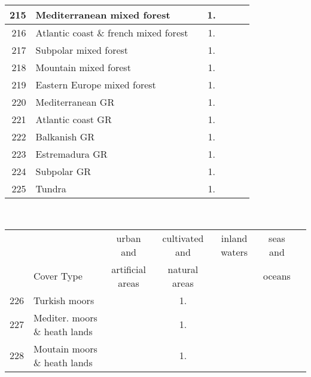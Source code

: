 {{\begin{tabular}{||r|l||c|c|c|c|c||}
 \hline
 \hline
         215  & Mediterranean mixed forest                                   &       &  1.   &       &       \\
 \hline
         216  & Atlantic coast \& french mixed forest                        &       &  1.   &       &       \\
 \hline
         217  & Subpolar mixed forest                                        &       &  1.   &       &       \\
 \hline
         218  & Mountain mixed forest                                        &       &  1.   &       &       \\
 \hline
         219  & Eastern Europe mixed forest                                  &       &  1.   &       &       \\
 \hline
 \hline
         220  & Mediterranean GR                                             &       &  1.   &       &       \\
 \hline
         221  & Atlantic coast GR                                            &       &  1.   &       &       \\
 \hline
         222  & Balkanish GR                                                 &       &  1.   &       &       \\
 \hline
         223  & Estremadura GR                                               &       &  1.   &       &       \\
 \hline
         224  & Subpolar GR                                                  &       &  1.   &       &       \\
 \hline
         225  & Tundra                                                       &       &  1.   &       &       \\
 \hline
 \hline
 \end{tabular}
 \clearpage
 \medskip\
 \begin{tabular}{||r|l||c|c|c|c|c||}
 \hline
 \hline
 && urban and & cultivated and &inland waters&seas and\\
 &Cover Type& artificial areas & natural areas&&oceans\\
 \hline
 \hline
         226  & Turkish moors                                                &       &  1.   &       &       \\
 \hline
         227  & Mediter. moors \& heath lands                                &       &  1.   &       &       \\
 \hline
         228  & Moutain moors \& heath lands                                 &       &  1.   &       &       \\

\end{tabular}}}
